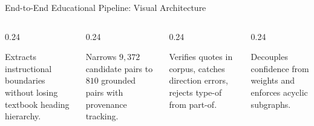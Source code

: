 \documentclass[aspectratio=169,10pt]{beamer}
\begin{document}
\begin{frame}{End-to-End Educational Pipeline: Visual Architecture}
    \vspace{0.25cm}
    \begin{columns}[T]
        \begin{column}{0.24\textwidth}
            \begin{tcolorbox}[colback=primaryblue!10,colframe=primaryblue,title=\textbf{1. Ingestion},sharp corners,boxsep=1pt,left=2pt,right=2pt,top=2pt,bottom=2pt]
                \tiny Extracts instructional boundaries without losing textbook heading hierarchy.
            \end{tcolorbox}
        \end{column}
        \begin{column}{0.24\textwidth}
            \begin{tcolorbox}[colback=accentteal!10,colframe=accentteal,title=\textbf{2. Candidates},sharp corners,boxsep=1pt,left=2pt,right=2pt,top=2pt,bottom=2pt]
                \tiny Narrows $9,372$ candidate pairs to $810$ grounded pairs with provenance tracking.
            \end{tcolorbox}
        \end{column}
        \begin{column}{0.24\textwidth}
            \begin{tcolorbox}[colback=primaryblue!10,colframe=primaryblue,title=\textbf{3. Verification},sharp corners,boxsep=1pt,left=2pt,right=2pt,top=2pt,bottom=2pt]
                \tiny Verifies quotes in corpus, catches direction errors, rejects type-of from part-of.
            \end{tcolorbox}
        \end{column}
        \begin{column}{0.24\textwidth}
            \begin{tcolorbox}[colback=successgreen!10,colframe=successgreen,title=\textbf{4. Assembly},sharp corners,boxsep=1pt,left=2pt,right=2pt,top=2pt,bottom=2pt]
                \tiny Decouples confidence from weights and enforces acyclic subgraphs.
            \end{tcolorbox}
        \end{column}
    \end{columns}
\end{frame}
\end{document}
